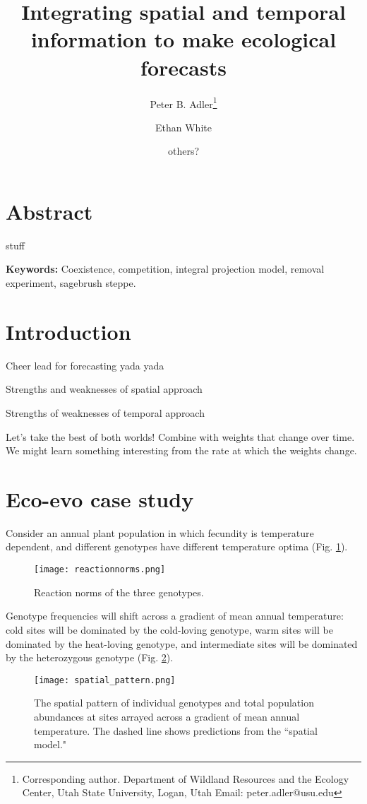 \documentclass[11pt]{article}
\title{Integrating spatial and temporal information to make ecological forecasts }
\author[1]{Peter B. Adler\thanks{Corresponding author. Department of Wildland Resources and the Ecology Center, Utah State University, Logan, Utah Email: peter.adler@usu.edu}}
\author[2]{Ethan White}
\author[3]{others?}
\affil[1]{Department of Wildland Resources and the Ecology Center, Utah State University, Logan, Utah}
\affil[2]{some shitty Florida joint}
\affil[3]{??}
\begin{document}
\maketitle

\linenumbers

\section*{Abstract}

stuff

\textbf{\large{Keywords:}} Coexistence, competition, integral projection model, removal experiment, sagebrush steppe. 

\section*{Introduction}

Cheer lead for forecasting yada yada 

Strengths and weaknesses of spatial approach

Strengths of weaknesses of temporal approach

Let's take the best of both worlds! Combine with weights that change over time. We might learn something interesting from the rate at which the weights change.

\section*{Eco-evo case study}

Consider an annual plant population in which fecundity is temperature dependent, and different genotypes have different temperature optima (Fig. \ref{fig:RxnNorms}).

\begin{figure}[tbp]
\centering
\texttt{[image: reactionnorms.png]}
\caption{Reaction norms of the three genotypes.}
\label{fig:RxnNorms}
\end{figure}

Genotype frequencies will shift across a gradient of mean annual temperature: cold sites will be dominated by the cold-loving genotype, warm sites will be dominated by the heat-loving genotype, and intermediate sites will be dominated by the heterozygous genotype (Fig. \ref{fig:SpatialPattern}).

\begin{figure}[tbp]
\centering
\texttt{[image: spatial\_pattern.png]}
\caption{The spatial pattern of individual genotypes and total population abundances at sites arrayed across a gradient of mean annual temperature. The dashed line shows predictions from the ``spatial model."}
\label{fig:SpatialPattern}
\end{figure}
\end{document}
